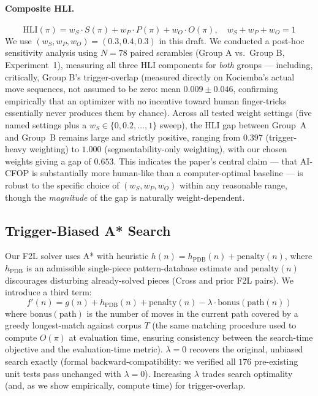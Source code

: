 \documentclass[10pt,conference]{article}
\begin{document}
\paragraph{Composite HLI.}
$$\mathrm{HLI}(\pi) = w_S \cdot S(\pi) + w_P \cdot P(\pi) + w_O \cdot O(\pi), \quad w_S{+}w_P{+}w_O = 1$$
We use $(w_S, w_P, w_O) = (0.3, 0.4, 0.3)$ in this draft. We
conducted a post-hoc sensitivity analysis using $N=78$ paired
scrambles (Group A vs.\ Group B, Experiment~1), measuring all three
HLI components for \emph{both} groups --- including, critically,
Group B's trigger-overlap (measured directly on Kociemba's actual
move sequences, not assumed to be zero: mean $0.009 \pm 0.046$,
confirming empirically that an optimizer with no incentive toward
human finger-tricks essentially never produces them by chance).
Across all tested weight settings (five named settings plus a
$w_S \in \{0,0.2,\ldots,1\}$ sweep), the HLI gap between Group~A and
Group~B remains large and strictly positive, ranging from $0.397$
(trigger-heavy weighting) to $1.000$ (segmentability-only
weighting), with our chosen weights giving a gap of $0.653$. This
indicates the paper's central claim --- that AI-CFOP is
substantially more human-like than a computer-optimal baseline ---
is robust to the specific choice of $(w_S,w_P,w_O)$ within any
reasonable range, though the \emph{magnitude} of the gap is
naturally weight-dependent.

\subsection{Trigger-Biased A* Search}

Our F2L solver uses A* with heuristic
$h(n) = h_{\mathrm{PDB}}(n) + \mathrm{penalty}(n)$, where
$h_{\mathrm{PDB}}$ is an admissible single-piece pattern-database
estimate and $\mathrm{penalty}(n)$ discourages disturbing
already-solved pieces (Cross and prior F2L pairs). We introduce a
third term:
$$f'(n) = g(n) + h_{\mathrm{PDB}}(n) + \mathrm{penalty}(n) - \lambda \cdot \mathrm{bonus}(\mathrm{path}(n))$$
where $\mathrm{bonus}(\mathrm{path})$ is the number of moves in the
current path covered by a greedy longest-match against corpus $T$
(the same matching procedure used to compute $O(\pi)$ at evaluation
time, ensuring consistency between the search-time objective and the
evaluation-time metric). $\lambda=0$ recovers the original,
unbiased search exactly (formal backward-compatibility: we verified
all $176$ pre-existing unit tests pass unchanged with $\lambda=0$).
Increasing $\lambda$ trades search optimality (and, as we show
empirically, compute time) for trigger-overlap.
\end{document}
